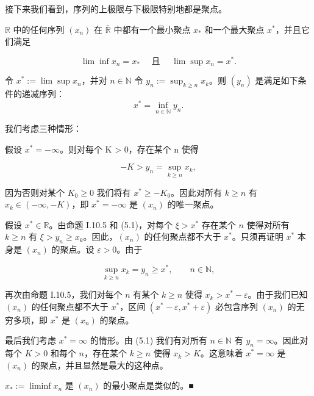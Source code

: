 接下来我们看到，序列的上极限与下极限特别地都是聚点。

\begin{theorem}

$ \mathbb{R} $ 中的任何序列 $ (x_n) $ 在 $ \bar{\mathbb{R}} $ 中都有一个最小聚点 $ x_* $ 和一个最大聚点 $ x^* $，并且它们满足

\[
\lim\inf x_{n}=x_{*}\quad\text{ 且 }\quad\lim\sup x_{n}=x^{*}.
\]

\proofhead
令 $ x^* := \lim \sup x_n $，并对 $ n \in \mathbb{N} $ 令 $ y_n := \sup_{k \geq n} x_k $。则 $ (y_n) $ 是满足如下条件的递减序列：
\begin{equation}
x^{*}=\inf_{n\in\mathbb{N}}y_{n}.
\end{equation}

我们考虑三种情形：

\begin{subitems}
\item

假设 $ x^* = -\infty $。则对每个 K > 0，存在某个 n 使得

\[
-K>y_{n}=\sup_{k\geq n}x_{k},
\]

因为否则对某个 $ K_0 \geq 0 $ 我们将有 $ x^* \geq -K_0 $。因此对所有 $ k \geq n $ 有 $ x_k \in (-\infty, -K) $，即 $ x^* = -\infty $ 是 $ (x_n) $ 的唯一聚点。

\item

假设 $ x^* \in \mathbb{R} $。由命题 I.10.5 和 (5.1)，对每个 $ \xi > x^* $ 存在某个 $ n $ 使得对所有 $ k \geq n $ 有 $ \xi > y_n \geq x_k $。因此，$ (x_n) $ 的任何聚点都不大于 $ x^* $。只须再证明 $ x^* $ 本身是 $ (x_n) $ 的聚点。设 $ \varepsilon > 0 $。由于

\[
\sup_{k\geq n}x_{k}=y_{n}\geq x^{*},\qquad n\in\mathbb{N},
\]

再次由命题 I.10.5，我们对每个 $n$ 有某个 $k \geq n$ 使得 $x_k > x^* - \varepsilon$。由于我们已知 $(x_n)$ 的任何聚点都不大于 $x^*$，区间 $(x^* - \varepsilon, x^* + \varepsilon)$ 必包含序列 $(x_n)$ 的无穷多项，即 $x^*$ 是 $(x_n)$ 的聚点。

\item

最后我们考虑 $ x^* = \infty $ 的情形。由 (5.1) 我们有对所有 $ n \in \mathbb{N} $ 有 $ y_n = \infty $。因此对每个 $ K > 0 $ 和每个 $ n $，存在某个 $ k \geq n $ 使得 $ x_k > K $。这意味着 $ x^* = \infty $ 是 $ (x_n) $ 的聚点，并且显然是最大的这种点。

\proofhead
$ x_* := \liminf x_n $ 是 $ (x_n) $ 的最小聚点是类似的。■
\end{subitems}

\end{theorem}

